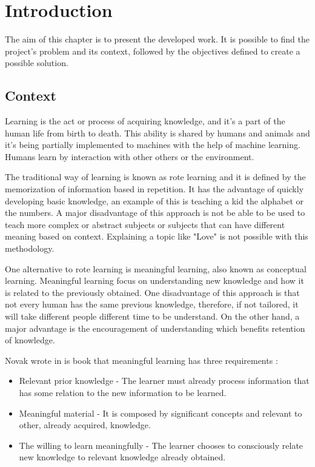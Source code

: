%
\chapter{Introduction} %
\label{chap:Chapter1} %

The aim of this chapter is to present the developed work.
It is possible to find the project's problem and its context, followed by the objectives defined to create a possible solution.

\section{Context}

Learning is the act or process of acquiring knowledge, and it's a part of the human life from birth to death.
This ability is shared by humans and animals and it's being partially implemented to machines with the help of machine learning.
Humans learn by interaction with other others or the environment.

The traditional way of learning is known as rote learning and it is defined by the memorization of information based in repetition.
It has the advantage of quickly developing basic knowledge, an example of this is teaching a kid the alphabet or the numbers.
A major disadvantage of this approach is not be able to be used to teach more complex or abstract subjects or subjects that can have different meaning based on context.
Explaining a topic like "Love" is not possible with this methodology.

One alternative to rote learning is meaningful learning, also known as conceptual learning.
Meaningful learning focus on understanding new knowledge and how it is related to the previously obtained.
One disadvantage of this approach is that not every human has the same previous knowledge, therefore, if not tailored, it will take different people different time to be understand.
On the other hand, a major advantage is the encouragement of understanding which benefits retention of knowledge.

Novak wrote in is book\cite{novak2010learning} that meaningful learning has three requirements :

\begin{itemize}
    \item Relevant prior knowledge - The learner must already process information that has some relation to the new information to be learned.
    \item Meaningful material - It is composed by significant concepts and relevant to other, already acquired, knowledge.
    \item The willing to learn meaningfully - The learner chooses to consciously relate new knowledge to relevant knowledge already obtained.
\end{itemize}

